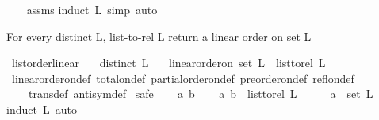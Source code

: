 \begin{isabellebody}
%
\isadelimproof
\ \ %
\endisadelimproof
%
\isatagproof
{}\isamarkupfalse%
\ assms\isanewline
{}\isamarkupfalse%
{\isacharparenleft}{\kern0pt}induct\ L{\isacharcomma}{\kern0pt}\ simp{\isacharcomma}{\kern0pt}\ auto{\isacharparenright}{\kern0pt}\ \isamarkupfalse%
%
\endisatagproof
{\isafoldproof}%
%
\isadelimproof
%
\endisadelimproof
%
\begin{isamarkuptext}%
For every distinct L, list-to-rel L return a linear order on set L%
\end{isamarkuptext}\isamarkuptrue%
\isamarkupfalse%
\ list{\isacharunderscore}{\kern0pt}order{\isacharunderscore}{\kern0pt}linear{\isacharcolon}{\kern0pt}\isanewline
\ \ \ {\isachardoublequoteopen}distinct\ L{\isachardoublequoteclose}\isanewline
\ \ \ {\isachardoublequoteopen}linear{\isacharunderscore}{\kern0pt}order{\isacharunderscore}{\kern0pt}on\ {\isacharparenleft}{\kern0pt}set\ L{\isacharparenright}{\kern0pt}\ \ {\isacharparenleft}{\kern0pt}list{\isacharunderscore}{\kern0pt}to{\isacharunderscore}{\kern0pt}rel\ L{\isacharparenright}{\kern0pt}{\isachardoublequoteclose}\ \isanewline
%
\isadelimproof
\ \ %
\endisadelimproof
%
\isatagproof
{}\isamarkupfalse%
\ linear{\isacharunderscore}{\kern0pt}order{\isacharunderscore}{\kern0pt}on{\isacharunderscore}{\kern0pt}def\ total{\isacharunderscore}{\kern0pt}on{\isacharunderscore}{\kern0pt}def\ partial{\isacharunderscore}{\kern0pt}order{\isacharunderscore}{\kern0pt}on{\isacharunderscore}{\kern0pt}def\ preorder{\isacharunderscore}{\kern0pt}on{\isacharunderscore}{\kern0pt}def\ refl{\isacharunderscore}{\kern0pt}on{\isacharunderscore}{\kern0pt}def\isanewline
\ \ \ \ trans{\isacharunderscore}{\kern0pt}def\ antisym{\isacharunderscore}{\kern0pt}def\ \isanewline
{}\isamarkupfalse%
{\isacharparenleft}{\kern0pt}safe{\isacharparenright}{\kern0pt}\isanewline
\ \ \isamarkupfalse%
\ a\ b\isanewline
\ \ \isamarkupfalse%
\ {\isachardoublequoteopen}{\isacharparenleft}{\kern0pt}a{\isacharcomma}{\kern0pt}\ b{\isacharparenright}{\kern0pt}\ {\isasymin}\ list{\isacharunderscore}{\kern0pt}to{\isacharunderscore}{\kern0pt}rel\ L{\isachardoublequoteclose}\isanewline
\ \ \isamarkupfalse%
\ \isamarkupfalse%
\ {\isachardoublequoteopen}a\ {\isasymin}\ set\ L{\isachardoublequoteclose}\ \isanewline
\ \ \isamarkupfalse%
{\isacharparenleft}{\kern0pt}induct\ L{\isacharcomma}{\kern0pt}\ auto{\isacharparenright}{\kern0pt}\ \isamarkupfalse%

\end{isabellebody}
